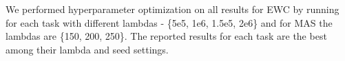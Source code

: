 \documentclass[11pt,a4paper]{article}
\begin{document}
\begin{table}[h!]
    \centering
    \caption{Three Tasks: MRPC$\rightarrow$SST-2$\rightarrow$RTE.}
    \begin{center}
    \end{center}
    \vspace{-0.5cm}
\end{table}




We performed hyperparameter optimization on all results for EWC by running for each task with different lambdas -  \{5e5, 1e6, 1.5e5, 2e6\} and for MAS the lambdas are  \{150, 200, 250\}. The reported results for each task are the best among their lambda and seed settings.
\end{document}
